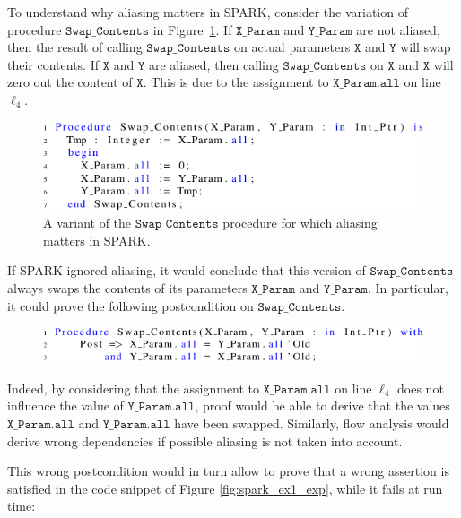 \documentclass{llncs}
\newcommand\var[1]{\ensuremath{\mathtt{#1}}}
\begin{document}
\smallskip
To understand why aliasing matters in SPARK, consider the variation of procedure \var{Swap\_Contents} in Figure~\ref{fig:spark_ex1}. If \var{X\_Param} and \var{Y\_Param}
are not aliased, then the result of calling \var{Swap\_Contents} on actual parameters \var{X} and \var{Y} will swap their contents. If \var{X} and \var{Y} are aliased, then calling
\var{Swap\_Contents} on \var{X} and \var{X} will zero out the content of \var{X}. This is due to the assignment to \var{X\_Param.all} on line $\ell_4$.


\begin{figure}[htb!]
\centering
  \captionsetup{justification=centering,margin=0.6cm}
   \includegraphics[]{spark_ex1}
   \caption{A variant of the \var{Swap\_Contents} procedure for which aliasing matters in SPARK.}
   \label{fig:spark_ex1}
\end{figure}

\smallskip
If SPARK ignored aliasing, it would conclude that this version of \var{Swap\_Contents} always swaps the contents of its parameters \var{X\_Param} and \var{Y\_Param}.
In particular, it could prove the following postcondition on \var{Swap\_Contents}.

\begin{figure}[htb!]
\centering
  \captionsetup{justification=centering,margin=0.6cm}
   \includegraphics[]{spark_ex1_proof}
   \label{fig:spark_ex1_proof}
\end{figure}

\smallskip
Indeed, by considering that the assignment to \var{X\_Param.all} on line $\ell_4$ does not influence the value of \var{Y\_Param.all}, proof would be able to
derive that the values \var{X\_Param.all} and \var{Y\_Param.all} have been swapped. Similarly, flow analysis would derive wrong dependencies if possible aliasing is not taken into account.

\smallskip
This wrong postcondition would in turn allow to prove that a wrong assertion is satisfied in the code snippet of Figure \ref{fig:spark_ex1_exp}, while it fails at run time:
\end{document}
